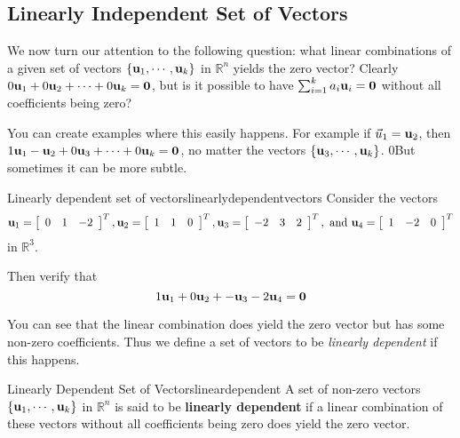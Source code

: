 \subsection{Linearly Independent Set of Vectors}

We now turn our attention to the following question: what linear
combinations of a given set of vectors $\{ {\bf u}_1, \cdots
,{\bf u}_k\}$ in $\mathbb{R}^{n}$ yields the zero vector? Clearly
$0{\bf u}_1 + 0{\bf u}_2+ \cdots + 0 {\bf u}_k = {\bf 0}$, but is
it possible to have $\sum_{i=1}^{k}a_{i}{\bf u}_{i}={\bf 0}$ without
all coefficients being zero?

You can create examples where this easily happens. For example if $\vec{u}_1={\bf u}_2$, then 
$1{\bf u}_1 - {\bf u}_2+ 0 {\bf u}_3 + \cdots  + 0 {\bf u}_k = {\bf 0}$, no matter the vectors 
 $\{ {\bf u}_3, \cdots ,{\bf u}_k\}$. 0But sometimes it can be more subtle. 

\begin{example}{Linearly dependent set of vectors}{linearlydependentvectors}
Consider the vectors 
\begin{equation*}
{\bf u}_1=\left[ 
\begin{array}{rrr}
0  & 1 & -2
\end{array}
\right]^T, 
{\bf u}_2=\left[ 
\begin{array}{rrr}
1  & 1 & 0
\end{array}
\right]^T, 
{\bf u}_3=\left[ 
\begin{array}{rrr}
-2  & 3 & 2
\end{array}
\right]^T, \mbox{ and } 
{\bf u}_4=\left[ 
\begin{array}{rrr}
1  & -2 & 0
\end{array}
\right]^T
\end{equation*}
in $\mathbb{R}^{3}$.

Then verify that 
\begin{equation*}
1{\bf u}_1 +0 {\bf u}_2+ - {\bf u}_3 -2 {\bf u}_4 = {\bf 0}
\end{equation*}
\end{example}

You can see that the linear combination does yield the zero vector but
has some non-zero coefficients. Thus we define a set of vectors to be
{\em linearly dependent} if this happens.

\begin{definition}{Linearly Dependent Set of Vectors}{lineardependent}
A set of non-zero vectors $\{ {\bf u}_1, \cdots ,{\bf u}_k\}$ in $\mathbb{R}^{n}$ is said to be 
\textbf{linearly dependent} if a linear combination of these vectors without all  coefficients being zero does yield the zero vector.
\end{definition}

